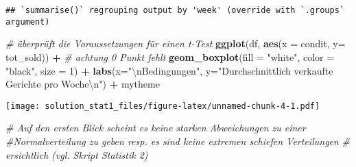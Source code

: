 \documentclass[
]{article}
\newenvironment{Shaded}{\begin{snugshade}}{\end{snugshade}}
\newcommand{\CharTok}[1]{\textcolor[rgb]{0.31,0.60,0.02}{#1}}
\newcommand{\CommentTok}[1]{\textcolor[rgb]{0.56,0.35,0.01}{\textit{#1}}}
\newcommand{\DataTypeTok}[1]{\textcolor[rgb]{0.13,0.29,0.53}{#1}}
\newcommand{\DecValTok}[1]{\textcolor[rgb]{0.00,0.00,0.81}{#1}}
\newcommand{\KeywordTok}[1]{\textcolor[rgb]{0.13,0.29,0.53}{\textbf{#1}}}
\newcommand{\NormalTok}[1]{#1}
\newcommand{\OperatorTok}[1]{\textcolor[rgb]{0.81,0.36,0.00}{\textbf{#1}}}
\newcommand{\StringTok}[1]{\textcolor[rgb]{0.31,0.60,0.02}{#1}}
\begin{document}
\begin{verbatim}
## `summarise()` regrouping output by 'week' (override with `.groups` argument)
\end{verbatim}

\begin{Shaded}
\begin{Highlighting}[]
\CommentTok{# überprüft die Voraussetzungen für einen t-Test}
\KeywordTok{ggplot}\NormalTok{(df, }\KeywordTok{aes}\NormalTok{(}\DataTypeTok{x =}\NormalTok{ condit, }\DataTypeTok{y=}\NormalTok{ tot_sold)) }\OperatorTok{+}\StringTok{ }\CommentTok{# achtung 0 Punkt fehlt}
\StringTok{    }\KeywordTok{geom_boxplot}\NormalTok{(}\DataTypeTok{fill =} \StringTok{"white"}\NormalTok{, }\DataTypeTok{color =} \StringTok{"black"}\NormalTok{, }\DataTypeTok{size =} \DecValTok{1}\NormalTok{) }\OperatorTok{+}\StringTok{ }
\StringTok{    }\KeywordTok{labs}\NormalTok{(}\DataTypeTok{x=}\StringTok{"}\CharTok{\textbackslash{}n}\StringTok{Bedingungen"}\NormalTok{, }\DataTypeTok{y=}\StringTok{"Durchschnittlich verkaufte Gerichte pro Woche}\CharTok{\textbackslash{}n}\StringTok{"}\NormalTok{) }\OperatorTok{+}\StringTok{ }
\StringTok{    }\NormalTok{mytheme}
\end{Highlighting}
\end{Shaded}

\texttt{[image: solution\_stat1\_files/figure-latex/unnamed-chunk-4-1.pdf]}

\begin{Shaded}
\begin{Highlighting}[]
\CommentTok{# Auf den ersten Blick scheint es keine starken Abweichungen zu einer }
\CommentTok{#Normalverteilung zu geben resp. es sind keine extremen schiefen Verteilungen}
\CommentTok{# ersichtlich (vgl. Skript Statistik 2)}
\end{Highlighting}
\end{Shaded}

\begin{Shaded}
\end{Shaded}
\end{document}
